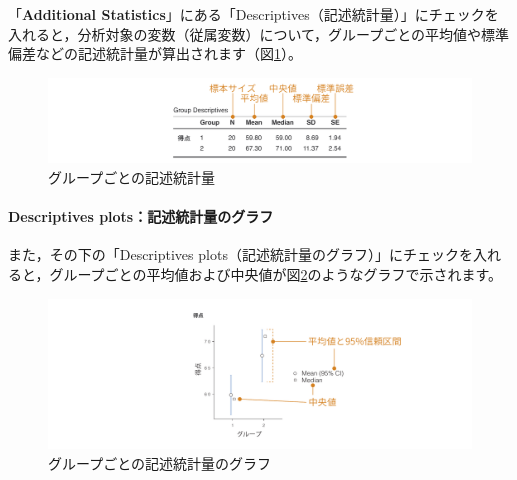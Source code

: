 \documentclass[
  12pt,
  a5jpaper,
  lualatex, ja=standard]{bxjsbook}
\begin{document}
「\textbf{Additional Statistics}」にある「Descriptives（記述統計量）」にチェックを入れると，分析対象の変数（従属変数）について，グループごとの平均値や標準偏差などの記述統計量が算出されます（図\ref{fig:ttests-descriptives}）。

\begin{figure}[!ht]

{\centering \includegraphics[width=1\linewidth]{images/ttests/descriptives} 

}

\caption{グループごとの記述統計量}\label{fig:ttests-descriptives}
\end{figure}

\hypertarget{descriptives-plotsux8a18ux8ff0ux7d71ux8a08ux91cfux306eux30b0ux30e9ux30d5}{%
\paragraph*{Descriptives plots：記述統計量のグラフ}\label{descriptives-plotsux8a18ux8ff0ux7d71ux8a08ux91cfux306eux30b0ux30e9ux30d5}}

また，その下の「Descriptives plots（記述統計量のグラフ）」にチェックを入れると，グループごとの平均値および中央値が図\ref{fig:ttests-desc-plot}のようなグラフで示されます。

\begin{figure}[!ht]

{\centering \includegraphics[width=1\linewidth]{images/ttests/desc-plot} 

}

\caption{グループごとの記述統計量のグラフ}\label{fig:ttests-desc-plot}
\end{figure}
\end{document}
